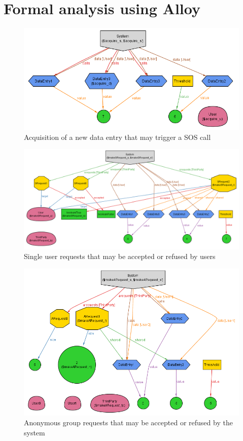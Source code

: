 \def \sourcepath {model.als}

\section{Formal analysis using Alloy}
\label{sec:alloy}

  

  \begin{figure}[h!]
    \centering
    \hspace*{-0cm}
    \includegraphics[width=\textwidth]{img/alloy/alloy_acquire.png}
    \caption{Acquisition of a new data entry that may trigger a SOS call}
    \label{fig:alloy_acquire}
  \end{figure}

  \begin{figure}[h!]
    \centering
    \hspace*{-1.5cm}
    \includegraphics[width=1.15\textwidth]{img/alloy/alloy_srequest.png}
    \caption{Single user requests that may be accepted or refused by users}
    \label{fig:alloy_srequest}
  \end{figure}

  \begin{figure}[h!]
    \centering
    \hspace*{-0cm}
    \includegraphics[width=\textwidth]{img/alloy/alloy_arequest.png}
    \caption{Anonymous group requests that may be accepted or refused by the system}
    \label{fig:alloy_arequest}
  \end{figure}
